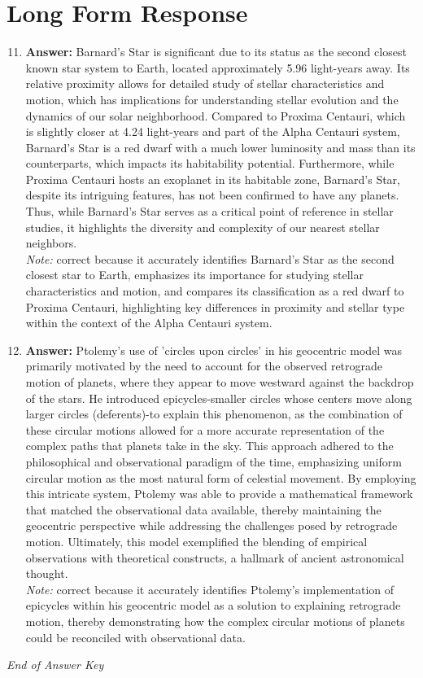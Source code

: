 \documentclass[12pt]{article}
\begin{document}
\section*{Long Form Response}
\begin{enumerate}[label=\arabic*.]
\setcounter{enumi}{10}
\item \textbf{Answer:} Barnard's Star is significant due to its status as the second closest known star system to Earth, located approximately 5.96 light-years away. Its relative proximity allows for detailed study of stellar characteristics and motion, which has implications for understanding stellar evolution and the dynamics of our solar neighborhood. Compared to Proxima Centauri, which is slightly closer at 4.24 light-years and part of the Alpha Centauri system, Barnard's Star is a red dwarf with a much lower luminosity and mass than its counterparts, which impacts its habitability potential. Furthermore, while Proxima Centauri hosts an exoplanet in its habitable zone, Barnard's Star, despite its intriguing features, has not been confirmed to have any planets. Thus, while Barnard's Star serves as a critical point of reference in stellar studies, it highlights the diversity and complexity of our nearest stellar neighbors.
\\ \textit{Note:} correct because it accurately identifies Barnard's Star as the second closest star to Earth, emphasizes its importance for studying stellar characteristics and motion, and compares its classification as a red dwarf to Proxima Centauri, highlighting key differences in proximity and stellar type within the context of the Alpha Centauri system.
\item \textbf{Answer:} Ptolemy's use of 'circles upon circles' in his geocentric model was primarily motivated by the need to account for the observed retrograde motion of planets, where they appear to move westward against the backdrop of the stars. He introduced epicycles-smaller circles whose centers move along larger circles (deferents)-to explain this phenomenon, as the combination of these circular motions allowed for a more accurate representation of the complex paths that planets take in the sky. This approach adhered to the philosophical and observational paradigm of the time, emphasizing uniform circular motion as the most natural form of celestial movement. By employing this intricate system, Ptolemy was able to provide a mathematical framework that matched the observational data available, thereby maintaining the geocentric perspective while addressing the challenges posed by retrograde motion. Ultimately, this model exemplified the blending of empirical observations with theoretical constructs, a hallmark of ancient astronomical thought.
\\ \textit{Note:} correct because it accurately identifies Ptolemy's implementation of epicycles within his geocentric model as a solution to explaining retrograde motion, thereby demonstrating how the complex circular motions of planets could be reconciled with observational data.
\end{enumerate}

\vfill
\noindent\textit{End of Answer Key}
\end{document}
